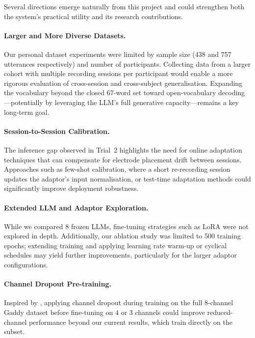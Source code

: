 Several directions emerge naturally from this project and could strengthen both the system's practical utility and its research contributions.

\paragraph{Larger and More Diverse Datasets.} Our personal dataset experiments were limited by sample size (438 and 757 utterances respectively) and number of participants. Collecting data from a larger cohort with multiple recording sessions per participant would enable a more rigorous evaluation of cross-session and cross-subject generalisation. Expanding the vocabulary beyond the closed 67-word set toward open-vocabulary decoding---potentially by leveraging the LLM's full generative capacity---remains a key long-term goal.

\paragraph{Session-to-Session Calibration.} The inference gap observed in Trial~2 highlights the need for online adaptation techniques that can compensate for electrode placement drift between sessions. Approaches such as few-shot calibration, where a short re-recording session updates the adaptor's input normalisation, or test-time adaptation methods could significantly improve deployment robustness.

\paragraph{Extended LLM and Adaptor Exploration.} While we compared 8 frozen LLMs, fine-tuning strategies such as LoRA \citep{mohapatra2025} were not explored in depth. Additionally, our ablation study was limited to 500 training epochs; extending training and applying learning rate warm-up or cyclical schedules may yield further improvements, particularly for the larger adaptor configurations.

\paragraph{Channel Dropout Pre-training.} Inspired by \citet{hwang2026}, applying channel dropout during training on the full 8-channel Gaddy dataset before fine-tuning on 4 or 3 channels could improve reduced-channel performance beyond our current results, which train directly on the subset.

